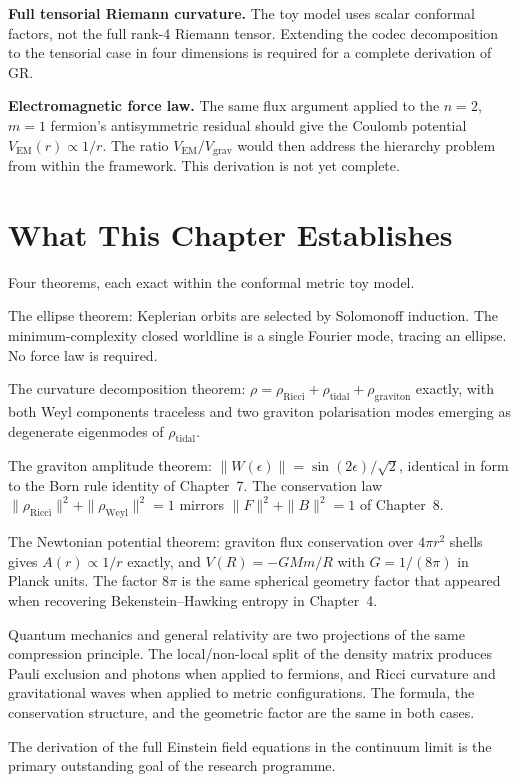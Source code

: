 \textbf{Full tensorial Riemann curvature.} The toy model uses scalar
conformal factors, not the full rank-4 Riemann tensor. Extending the
codec decomposition to the tensorial case in four dimensions is
required for a complete derivation of GR.

\textbf{Electromagnetic force law.} The same flux argument applied to
the $n = 2$, $m = 1$ fermion's antisymmetric residual should give the
Coulomb potential $V_{\mathrm{EM}}(r) \propto 1/r$. The ratio
$V_{\mathrm{EM}}/V_{\mathrm{grav}}$ would then address the hierarchy
problem from within the framework. This derivation is not yet complete.

\section{What This Chapter Establishes}

Four theorems, each exact within the conformal metric toy model.

The ellipse theorem: Keplerian orbits are selected by Solomonoff
induction. The minimum-complexity closed worldline is a single Fourier
mode, tracing an ellipse. No force law is required.

The curvature decomposition theorem: $\rho = \rho_{\mathrm{Ricci}} +
\rho_{\mathrm{tidal}} + \rho_{\mathrm{graviton}}$ exactly, with both
Weyl components traceless and two graviton polarisation modes emerging
as degenerate eigenmodes of $\rho_{\mathrm{tidal}}$.

The graviton amplitude theorem: $\|W(\epsilon)\| =
\sin(2\epsilon)/\sqrt{2}$, identical in form to the Born rule identity
of Chapter~7. The conservation law $\|\rho_{\mathrm{Ricci}}\|^2 +
\|\rho_{\mathrm{Weyl}}\|^2 = 1$ mirrors $\|F\|^2 + \|B\|^2 = 1$ of
Chapter~8.

The Newtonian potential theorem: graviton flux conservation over
$4\pi r^2$ shells gives $A(r) \propto 1/r$ exactly, and
$V(R) = -GMm/R$ with $G = 1/(8\pi)$ in Planck units. The factor
$8\pi$ is the same spherical geometry factor that appeared when
recovering Bekenstein--Hawking entropy in Chapter~4.

Quantum mechanics and general relativity are two projections of the
same compression principle. The local/non-local split of the density
matrix produces Pauli exclusion and photons when applied to fermions,
and Ricci curvature and gravitational waves when applied to metric
configurations. The formula, the conservation structure, and the
geometric factor are the same in both cases.

The derivation of the full Einstein field equations in the continuum limit
is the primary outstanding goal of the research programme.
